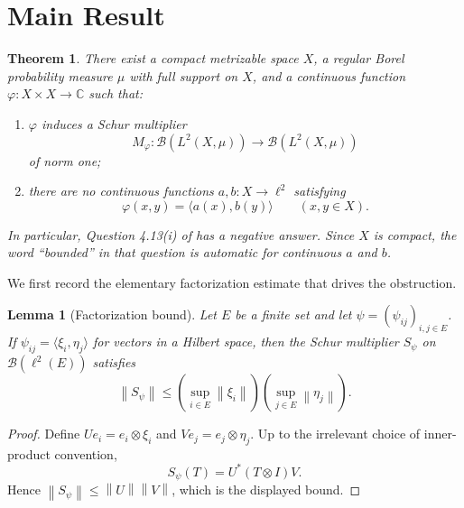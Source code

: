 \documentclass[11pt]{article}
\newtheorem{theorem}{Theorem}
\newtheorem{lemma}{Lemma}
\newcommand{\C}{\mathbb C}
\newcommand{\B}{\mathcal B}
\newcommand{\ellTwo}{\ell^2}
\newcommand{\norm}[1]{\left\lVert #1\right\rVert}
\begin{document}
\section*{Main Result}

\begin{theorem}\label{thm:main}
There exist a compact metrizable space $X$, a regular Borel probability
measure $\mu$ with full support on $X$, and a continuous function
$\varphi:X\times X\to\C$ such that:
\begin{enumerate}
\item $\varphi$ induces a Schur multiplier
\[
 M_\varphi:\B(L^2(X,\mu))\longrightarrow\B(L^2(X,\mu))
\]
of norm one;
\item there are no continuous functions $a,b:X\to\ellTwo$ satisfying
\[
             \varphi(x,y)=\langle a(x),b(y)\rangle
             \qquad (x,y\in X).
\]
\end{enumerate}
In particular, Question 4.13(i) of \cite{SteenTodorovTurowska} has a negative
answer.  Since $X$ is compact, the word ``bounded'' in that question is
automatic for continuous $a$ and $b$.
\end{theorem}

We first record the elementary factorization estimate that drives the
obstruction.

\begin{lemma}[Factorization bound]\label{lem:factorization}
Let $E$ be a finite set and let $\psi=(\psi_{ij})_{i,j\in E}$.  If
$\psi_{ij}=\langle \xi_i,\eta_j\rangle$ for vectors in a Hilbert space, then
the Schur multiplier $S_\psi$ on $\B(\ell^2(E))$ satisfies
\[
       \norm{S_\psi}\leq
       \left(\sup_{i\in E}\norm{\xi_i}\right)
       \left(\sup_{j\in E}\norm{\eta_j}\right).
\]
\end{lemma}

\begin{proof}
Define $Ue_i=e_i\otimes\xi_i$ and $Ve_j=e_j\otimes\eta_j$.  Up to the
irrelevant choice of inner-product convention,
\[
                       S_\psi(T)=U^*(T\otimes I)V.
\]
Hence $\norm{S_\psi}\leq\norm U\norm V$, which is the displayed bound.
\end{proof}
\end{document}
